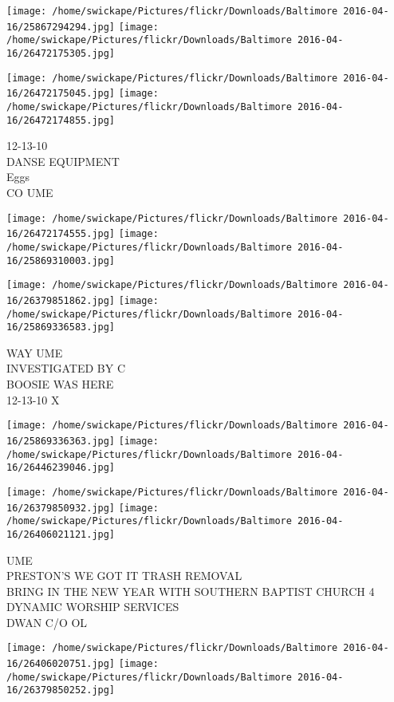 \documentclass[10pt,letterpaper]{article}
\begin{document}
\texttt{[image: /home/swickape/Pictures/flickr/Downloads/Baltimore 2016-04-16/25867294294.jpg]}
\texttt{[image: /home/swickape/Pictures/flickr/Downloads/Baltimore 2016-04-16/26472175305.jpg]}

\texttt{[image: /home/swickape/Pictures/flickr/Downloads/Baltimore 2016-04-16/26472175045.jpg]}
\texttt{[image: /home/swickape/Pictures/flickr/Downloads/Baltimore 2016-04-16/26472174855.jpg]}

12{-}13{-}10\\
DANSE EQUIPMENT\\
Eggs\\
CO UME\\
\pagebreak

\texttt{[image: /home/swickape/Pictures/flickr/Downloads/Baltimore 2016-04-16/26472174555.jpg]}
\texttt{[image: /home/swickape/Pictures/flickr/Downloads/Baltimore 2016-04-16/25869310003.jpg]}

\texttt{[image: /home/swickape/Pictures/flickr/Downloads/Baltimore 2016-04-16/26379851862.jpg]}
\texttt{[image: /home/swickape/Pictures/flickr/Downloads/Baltimore 2016-04-16/25869336583.jpg]}

WAY UME\\
INVESTIGATED BY C\\
BOOSIE WAS HERE\\
12{-}13{-}10 X\\
\pagebreak

\texttt{[image: /home/swickape/Pictures/flickr/Downloads/Baltimore 2016-04-16/25869336363.jpg]}
\texttt{[image: /home/swickape/Pictures/flickr/Downloads/Baltimore 2016-04-16/26446239046.jpg]}

\texttt{[image: /home/swickape/Pictures/flickr/Downloads/Baltimore 2016-04-16/26379850932.jpg]}
\texttt{[image: /home/swickape/Pictures/flickr/Downloads/Baltimore 2016-04-16/26406021121.jpg]}

UME\\
PRESTON'S WE GOT IT TRASH REMOVAL\\
BRING IN THE NEW YEAR WITH SOUTHERN BAPTIST CHURCH 4 DYNAMIC WORSHIP SERVICES\\
DWAN C/O OL\\
\pagebreak

\texttt{[image: /home/swickape/Pictures/flickr/Downloads/Baltimore 2016-04-16/26406020751.jpg]}
\texttt{[image: /home/swickape/Pictures/flickr/Downloads/Baltimore 2016-04-16/26379850252.jpg]}
\end{document}
